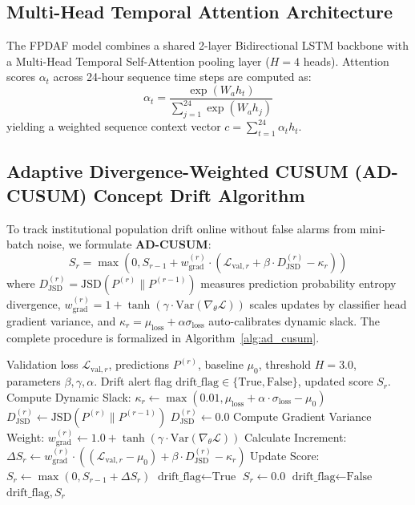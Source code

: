 \documentclass[conference]{IEEEtran}
\begin{document}
\subsection{Multi-Head Temporal Attention Architecture}
The FPDAF model combines a shared 2-layer Bidirectional LSTM backbone with a Multi-Head Temporal Self-Attention pooling layer ($H=4$ heads). Attention scores $\alpha_t$ across 24-hour sequence time steps are computed as:
$$\alpha_t = \frac{\exp(W_a h_t)}{\sum_{j=1}^{24} \exp(W_a h_j)}$$
yielding a weighted sequence context vector $c = \sum_{t=1}^{24} \alpha_t h_t$.

\subsection{Adaptive Divergence-Weighted CUSUM (AD-CUSUM) Concept Drift Algorithm}
To track institutional population drift online without false alarms from mini-batch noise, we formulate \textbf{AD-CUSUM}:
$$S_r = \max\left(0, S_{r-1} + w_{\text{grad}}^{(r)} \cdot \left(\mathcal{L}_{\text{val}, r} + \beta \cdot D_{\text{JSD}}^{(r)} - \kappa_r\right)\right)$$
where $D_{\text{JSD}}^{(r)} = \text{JSD}\left(P^{(r)} \parallel P^{(r-1)}\right)$ measures prediction probability entropy divergence, $w_{\text{grad}}^{(r)} = 1 + \tanh(\gamma \cdot \text{Var}(\nabla_\theta \mathcal{L}))$ scales updates by classifier head gradient variance, and $\kappa_r = \mu_{\text{loss}} + \alpha \sigma_{\text{loss}}$ auto-calibrates dynamic slack. The complete procedure is formalized in Algorithm~\ref{alg:ad_cusum}.

\begin{algorithm}[htbp]
\caption{Proposed AD-CUSUM Drift Detection Algorithm (Project Invention)}
\label{alg:ad_cusum}
\begin{algorithmic}[1]
\REQUIRE Validation loss $\mathcal{L}_{\text{val}, r}$, predictions $P^{(r)}$, baseline $\mu_0$, threshold $H = 3.0$, parameters $\beta, \gamma, \alpha$.
\ENSURE Drift alert flag $\text{drift\_flag} \in \{\text{True}, \text{False}\}$, updated score $S_r$.
\STATE Compute Dynamic Slack: $\kappa_r \leftarrow \max(0.01, \mu_{\text{loss}} + \alpha \cdot \sigma_{\text{loss}} - \mu_0)$
    \STATE $D_{\text{JSD}}^{(r)} \leftarrow \text{JSD}\left(P^{(r)} \parallel P^{(r-1)}\right)$
\ELSE
    \STATE $D_{\text{JSD}}^{(r)} \leftarrow 0.0$
\ENDIF
\STATE Compute Gradient Variance Weight: $w_{\text{grad}}^{(r)} \leftarrow 1.0 + \tanh\left(\gamma \cdot \text{Var}(\nabla_\theta \mathcal{L})\right)$
\STATE Calculate Increment: $\Delta S_r \leftarrow w_{\text{grad}}^{(r)} \cdot \left((\mathcal{L}_{\text{val}, r} - \mu_0) + \beta \cdot D_{\text{JSD}}^{(r)} - \kappa_r\right)$
\STATE Update Score: $S_r \leftarrow \max(0, S_{r-1} + \Delta S_r)$
    \STATE $\text{drift\_flag} \leftarrow \text{True}$ 
    \STATE $S_r \leftarrow 0.0$ 
\ELSE
    \STATE $\text{drift\_flag} \leftarrow \text{False}$
\ENDIF
\RETURN $\text{drift\_flag}, S_r$
\end{algorithmic}
\end{algorithm}
\end{document}
